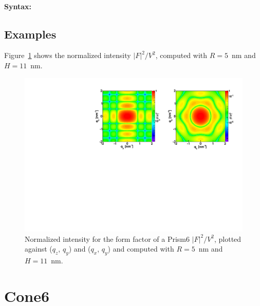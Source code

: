 \paragraph{Syntax:}  

\subsection{Examples}
Figure~\ref{fig:FFprism6Ex} shows the normalized intensity
$|F|^2/V^2$, computed with $R=5$~nm and \mbox{$H=11$~nm.}

\begin{figure}[h]
\begin{center}
\includegraphics[width=\textwidth]{Figures/figffprism6}
\end{center}
\caption{Normalized intensity for the form factor of a Prism6
  $|F|^2/V^2$, plotted against ($q_z$, $q_y$) and ($q_x$, $q_y$) and computed with $R=5$~nm and $H=11$~nm.}
\label{fig:FFprism6Ex}
\end{figure}

\FloatBarrier


\newpage{\cleardoublepage}
\section{Cone6}  

